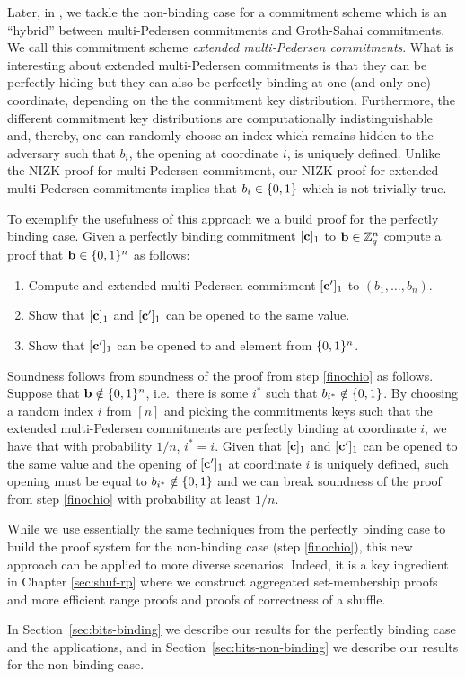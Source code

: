 Later, in \cite{ACNS:GonRaf16}, we tackle the non-binding case for a commitment scheme which is an ``hybrid'' between multi-Pedersen commitments and Groth-Sahai commitments. We call this commitment scheme \emph{extended multi-Pedersen commitments}. What is interesting about extended multi-Pedersen commitments is that they can be perfectly hiding but they can also be perfectly binding at one (and only one) coordinate, depending on the the commitment key distribution. Furthermore, the different commitment key distributions are computationally indistinguishable and, thereby, one can randomly choose an index which remains hidden to the adversary such that $b_i$, the opening at coordinate $i$, is uniquely defined. Unlike the NIZK proof for multi-Pedersen commitment, our NIZK proof for extended multi-Pedersen commitments implies that $b_i\in\{0,1\}$ which is not trivially true.

To exemplify the usefulness of this approach we a build proof for the perfectly binding case. Given a perfectly binding commitment $[\mathbf{c}]_1$ to $\mathbf{b}\in\mathbb{Z}_q^n$ compute a proof that $\mathbf{b}\in\{0,1\}^n$ as follows:
\begin{enumerate}
\item Compute and extended multi-Pedersen commitment $[\mathbf{c}']_1$ to $(b_1,\ldots,b_n)$.
\item Show that $[\mathbf{c}]_1$ and $[\mathbf{c}']_1$  can be opened to the same value.
\item Show that $[\mathbf{c}']_1$ can be opened to and element from $\{0,1\}^n$. \label{finochio}
\end{enumerate}
Soundness follows from soundness of the proof from step \ref{finochio} as follows. Suppose that $\mathbf{b}\notin \{0,1\}^n$, i.e.~there is some $i^*$ such that $b_{i^*}\notin\{0,1\}$. By choosing a random index $i$ from $[n]$ and picking the commitments keys such that the extended multi-Pedersen commitments are perfectly binding at coordinate $i$, we have that with probability $1/n$, $i^*=i$. Given that $[\mathbf{c}]_1$ and $[\mathbf{c}']_1$ can be opened to the same value and the opening of $[\mathbf{c}']_1$ at coordinate $i$ is uniquely defined, such opening must be equal to $b_{i^*}\notin\{0,1\}$ and we can break soundness of the proof from step \ref{finochio} with probability at least $1/n$.
 
While we use essentially the same techniques from the perfectly binding case to build the proof system for the non-binding case (step \ref{finochio}), this new approach can be applied to more diverse scenarios. Indeed, it is a key ingredient in Chapter \ref{sec:shuf-rp} where we construct {aggregated set-membership proofs} and more efficient {range proofs} and {proofs of correctness of a shuffle}.

In Section~\ref{sec:bits-binding} we describe our results for the perfectly binding case and the applications, and in Section~\ref{sec:bits-non-binding} we describe our results for the non-binding case.
